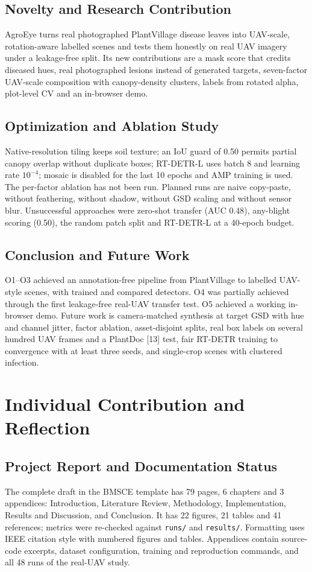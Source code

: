 \documentclass[12pt,a4paper]{report}
\theoremstyle{definition}
\theoremstyle{remark}
\begin{document}
\subsection{Novelty and Research Contribution}
AgroEye turns real photographed PlantVillage disease leaves into UAV-scale, rotation-aware labelled scenes and tests them honestly on real UAV imagery under a leakage-free split. Its new contributions are a mask score that credits diseased hues, real photographed lesions instead of generated targets, seven-factor UAV-scale composition with canopy-density clusters, labels from rotated alpha, plot-level CV and an in-browser demo.

\subsection{Optimization and Ablation Study}
Native-resolution tiling keeps soil texture; an IoU guard of 0.50 permits partial canopy overlap without duplicate boxes; RT-DETR-L uses batch 8 and learning rate $10^{-4}$; mosaic is disabled for the last 10 epochs and AMP training is used. The per-factor ablation has not been run. Planned runs are naive copy-paste, without feathering, without shadow, without GSD scaling and without sensor blur. Unsuccessful approaches were zero-shot transfer (AUC 0.48), any-blight scoring (0.50), the random patch split and RT-DETR-L at a 40-epoch budget.

\subsection{Conclusion and Future Work}
O1--O3 achieved an annotation-free pipeline from PlantVillage to labelled UAV-style scenes, with trained and compared detectors. O4 was partially achieved through the first leakage-free real-UAV transfer test. O5 achieved a working in-browser demo. Future work is camera-matched synthesis at target GSD with hue and channel jitter, factor ablation, asset-disjoint splits, real box labels on several hundred UAV frames and a PlantDoc [13] test, fair RT-DETR training to convergence with at least three seeds, and single-crop scenes with clustered infection.

\section{Individual Contribution and Reflection}
\subsection{Project Report and Documentation Status}
The complete draft in the BMSCE template has 79 pages, 6 chapters and 3 appendices: Introduction, Literature Review, Methodology, Implementation, Results and Discussion, and Conclusion. It has 22 figures, 21 tables and 41 references; metrics were re-checked against \texttt{runs/} and \texttt{results/}. Formatting uses IEEE citation style with numbered figures and tables. Appendices contain source-code excerpts, dataset configuration, training and reproduction commands, and all 48 runs of the real-UAV study.
\end{document}
